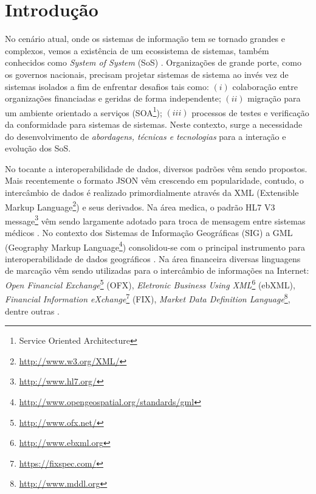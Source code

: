 \documentclass[msc,proposal,hidelot,hideabstract]{ppgccufmg} %
\begin{document}
\chapter{Introdução}
\label{ch:Contexto}
No cenário atual, onde os sistemas de informação tem se tornado grandes e complexos, vemos a existência de um ecossistema de sistemas, também conhecidos como \textit{System of System} (SoS) \cite{Nakagawa:2013:SAF:2489850.2489853}. Organizações de grande porte, como os governos nacionais, precisam projetar sistemas de sistema ao invés vez de sistemas isolados a fim de enfrentar desafios tais como: $(i)$ colaboração entre organizações financiadas e geridas de forma independente; $(ii)$ migração para um ambiente orientado a serviços (SOA\footnote{Service Oriented Architecture }); $(iii)$ processos de testes e verificação da conformidade para sistemas de sistemas. Neste contexto, surge a necessidade do desenvolvimento de \textit{abordagens, técnicas e tecnologias} para a interação e evolução dos SoS.
     
No tocante a interoperabilidade de dados, diversos padrões vêm sendo propostos. Mais recentemente o formato JSON \cite{RFC4627} vêm crescendo em popularidade, contudo, o intercâmbio de dados é realizado primordialmente através da XML (Extensible Markup Language\footnote{\url{http://www.w3.org/XML/}}) e seus derivados. Na área medica, o padrão HL7 V3 message\footnote{\url{http://www.hl7.org/}} vêm sendo largamente adotado para troca de mensagem entre sistemas médicos \cite{Andrikopoulos:2013:TEO:2491845.2491890}{}. No contexto dos Sistemas de Informação Geográficas (SIG) a GML (Geography Markup Language\footnote{\url{http://www.opengeospatial.org/standards/gml}}) consolidou-se com o principal instrumento para interoperabilidade de dados geográficos \cite{gmlpaper}{}. Na área financeira diversas linguagens de marcação vêm sendo utilizadas para o intercâmbio de informações na Internet: \textit{Open Financial Exchange}\footnote{\url{http://www.ofx.net/}} (OFX), \textit{Eletronic Business Using XML}\footnote{\url{http://www.ebxml.org}} (ebXML), \textit{Financial Information eXchange}\footnote{\url{https://fixspec.com/}} (FIX), \textit{Market Data Definition Language}\footnote{\url{http://www.mddl.org}}, dentre outras \cite{xbrl_conceitos_aplicacoes}{}.
\end{document}
